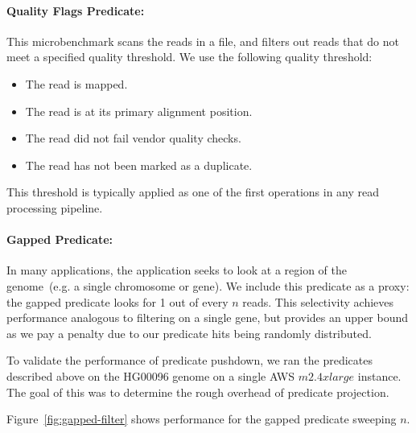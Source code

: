 \documentclass{acm_proc_article-sp}
\begin{document}
\paragraph{Quality Flags Predicate:}
\label{sec:quality-flags-predicate}

This microbenchmark scans the reads in a file, and filters out reads that do not meet a specified quality threshold. We use the following
quality threshold:

\begin{itemize}
\item The read is mapped.
\item The read is at its primary alignment position.
\item The read did not fail vendor quality checks.
\item The read has not been marked as a duplicate.
\end{itemize}
This threshold is typically applied as one of the first operations in any read processing pipeline.

\paragraph{Gapped Predicate:}
\label{sec:gapped-predicate}

In many applications, the application seeks to look at a region of the genome~(e.g. a single chromosome or gene). We include this
predicate as a proxy: the gapped predicate looks for 1 out of every $n$ reads. This selectivity achieves performance analogous to filtering
on a single gene, but provides an upper bound as we pay a penalty due to our predicate hits being randomly distributed.

To validate the performance of predicate pushdown, we ran the predicates described above on the HG00096 genome on a
single AWS $m2.4xlarge$ instance. The goal of this was to determine the rough overhead of predicate projection.

Figure~\ref{fig:gapped-filter} shows performance for the gapped predicate sweeping $n$.
\end{document}

